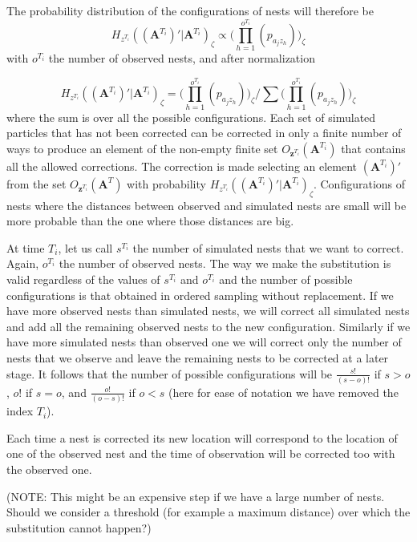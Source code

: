 \documentclass[11pt,a4paper]{article}
\renewcommand{\vec}[1]{\mathbf{#1}}
\begin{document}
The probability distribution of the configurations of nests will therefore be
\begin{equation*}
    H_{z^{T_i}}((\vec{A}^{T_i})' | \vec{A}^{T_i})_{\zeta} \propto \Bigg( \prod_{h = 1}^{o^{T_i}} (p_{a_j z_h}) \Bigg)_{\zeta}
\end{equation*}
with $o^{T_i}$ the number of observed nests, and after normalization 

\begin{equation*}
    H_{z^{T_i}}((\vec{A}^{T_i})' | \vec{A}^{T_i})_{\zeta} = \Bigg(\prod_{h = 1}^{o^{T_i}} (p_{a_j z_h}) \Bigg)_{\zeta} / \sum \Bigg(\prod_{h = 1}^{o^{T_i}} (p_{a_j z_h}) \Bigg)_{\zeta}
\end{equation*} 
where the sum is over all the possible configurations. Each set of simulated particles that has not been corrected can be corrected in only a finite number of ways to produce an element of the non-empty finite set $O_{\vec{z}^{T_i}} (\vec{A}^{T_i})$ that contains all the allowed corrections. The correction is made selecting an element $(\vec{A}^{T_i})'$ from the set $O_{\vec{z}^{T_i}} (\vec{A}^T)$ with probability $H_{z^{T_i}}((\vec{A}^{T_i})' | \vec{A}^{T_i})_{\zeta}$. Configurations of nests where the distances between observed and simulated nests are small will be more probable than the one where those distances are big.

At time $T_i$, let us call $s^{T_i}$ the number of simulated nests that we want to correct. Again, $o^{T_i}$ the number of observed nests. The way we make the substitution is valid regardless of the values of $s^{T_i}$ and $o^{T_i}$ and the number of possible configurations is that obtained in ordered sampling without replacement. If we have more observed nests than simulated nests, we will correct all simulated nests and add all the remaining observed nests to the new configuration. Similarly if we have more simulated nests than observed one we will correct only the number of nests that we observe and leave the remaining nests to be corrected at a later stage.
It follows that the number of possible configurations will be $\frac{s!}{(s-o)!}$ if $s > o$, $o!$ if $s = o$, and $\frac{o!}{(o-s)!}$ if $o < s$ (here for ease of notation we have removed the index ${T_i}$).

Each time a nest is corrected its new location will correspond to the location of one of the observed nest and the time of observation will be corrected too with the observed one.

(NOTE: This might be an expensive step if we have a large number of nests. Should we consider a threshold (for example a maximum distance) over which the substitution cannot happen?)
\end{document}
